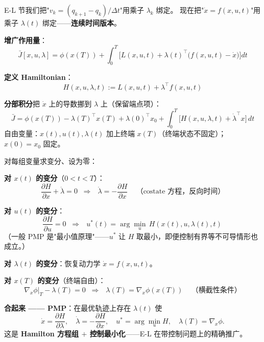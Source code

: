 \documentclass[12pt, a4paper]{ctexart}
\begin{document}
\begin{blackboard}

E-L 节我们把"$v_k = (q_{k+1}-q_k)/\Delta t$"用乘子 $\lambda_k$ 绑定。
现在把"$\dot x = f(x, u, t)$"用乘子 $\lambda(t)$ 绑定——\textbf{连续时间版本}。

\textbf{增广作用量}：
\[
\bar J[x, u, \lambda] = \phi(x(T)) + \int_0^T \Big[L(x, u, t) + \lambda(t)^\top\!\big(f(x, u, t) - \dot x\big)\Big] dt
\]

\textbf{定义 Hamiltonian}：
\[
\boxed{\;H(x, u, \lambda, t) := L(x, u, t) + \lambda^\top f(x, u, t)\;}
\]

\textbf{分部积分}把 $\dot x$ 上的导数挪到 $\lambda$ 上（保留端点项）：
\[
\bar J = \phi(x(T)) - \lambda(T)^\top x(T) + \lambda(0)^\top x_0 + \int_0^T \big[H(x, u, \lambda, t) + \dot\lambda^\top x\big]\, dt
\]
自由变量：$x(t), u(t), \lambda(t)$ 加上终端 $x(T)$（终端状态不固定）；$x(0) = x_0$ 固定。

\end{blackboard}

\begin{blackboard}

对每组变量求变分、设为零：

\textbf{对 $x(t)$ 的变分}（$0 < t < T$）：
\[
\frac{\partial H}{\partial x} + \dot\lambda = 0
\;\;\Longrightarrow\;\;
\boxed{\,\dot\lambda = -\frac{\partial H}{\partial x}\,}
\quad\text{（costate 方程，反向时间）}
\]

\textbf{对 $u(t)$ 的变分}：
\[
\frac{\partial H}{\partial u} = 0
\;\;\Longrightarrow\;\;
\boxed{\,u^*(t) = \arg\min_u\, H(x(t), u, \lambda(t), t)\,}
\]
（一般 PMP 是"最小值原理"——$u^*$ 让 $H$ 取最小，即便控制有界等不可导情形也成立。）

\textbf{对 $\lambda(t)$ 的变分}：恢复动力学 $\dot x = f(x, u, t)$。

\textbf{对 $x(T)$ 的变分}（终端自由）：
\[
\nabla_x\phi\big|_T - \lambda(T) = 0
\;\;\Longrightarrow\;\;
\boxed{\,\lambda(T) = \nabla_x \phi(x(T))\,}\quad\text{（横截性条件）}
\]

\textbf{合起来 —— PMP}：在最优轨迹上存在 $\lambda(t)$ 使
\[
\dot x = \frac{\partial H}{\partial \lambda},\quad
\dot\lambda = -\frac{\partial H}{\partial x},\quad
u^* = \arg\min_u H,\quad
\lambda(T) = \nabla_x\phi.
\]
这是 \textbf{Hamilton 方程组 $+$ 控制最小化}——E-L 在带控制问题上的精确推广。

\end{blackboard}
\end{document}
